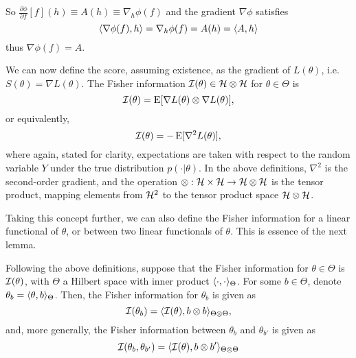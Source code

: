 \documentclass[a4paper,showframe,11pt,draft]{report}
\begin{document}
So $\frac{\partial\phi}{\partial f}[f](h) \equiv A(h) \equiv \nabla_h \phi(f)$ and the gradient $\nabla\phi$ satisfies
\[
  \langle\nabla\phi(f),h\rangle = \nabla_h \phi(f) =  A(h) = \langle A,h\rangle
\]
thus $\nabla\phi(f) = A$.

\newpage
We can now define the score, assuming existence, as the gradient of $L(\theta)$, i.e. $S(\theta) = \nabla L(\theta)$.  
The Fisher information ${\mathcal I}(\theta) \in \mathcal {{\mathcal H}} \otimes \mathcal {{\mathcal H}}$ for $\theta \in \Theta$ is
\[
	{\mathcal I}(\theta) = \operatorname{E}[\nabla L(\theta) \otimes \nabla L(\theta)],
\]
or equivalently,
\[
	{\mathcal I}(\theta) = -\operatorname{E}[\nabla^2 L(\theta)],
\]
where again, stated for clarity, expectations are taken with respect to the random variable $Y$ under the true distribution $p(\cdot|\theta)$.
In the above definitions, $\nabla^2$ is the second-order gradient, and the operation $\otimes:{\mathcal H} \times {\mathcal H} \to {\mathcal H} \otimes {\mathcal H}$ is the tensor product, mapping elements from ${\mathcal H}^2$ to the tensor product space ${\mathcal H} \otimes {\mathcal H}$.

Taking this concept further, we can also define the Fisher information for a linear functional of $\theta$, or between two linear functionals of $\theta$.
This is essence of the next lemma.

\begin{lemma}\label{thm:fisherlinfunc}
	Following the above definitions, suppose that the Fisher information for $\theta \in \Theta$ is ${\mathcal I}(\theta)$, with $\Theta$ a Hilbert space with inner product $\langle\cdot,\cdot\rangle_\Theta$.
	For some $b\in\Theta$, denote $\theta_b = \langle\theta,b\rangle_\Theta$.
	Then, the Fisher information for $\theta_b$ is given as
	\[
		{\mathcal I}(\theta_b) = \langle{\mathcal I}(\theta), b \otimes b\rangle_{\Theta \otimes \Theta},
	\]
	and, more generally, the Fisher information between $\theta_b$ and $\theta_{b'}$ is given as
	\[
		{\mathcal I}(\theta_b,\theta_{b'}) = \langle{\mathcal I}(\theta), b \otimes b'\rangle_{\Theta \otimes \Theta}
	\]
\end{lemma}
\end{document}
